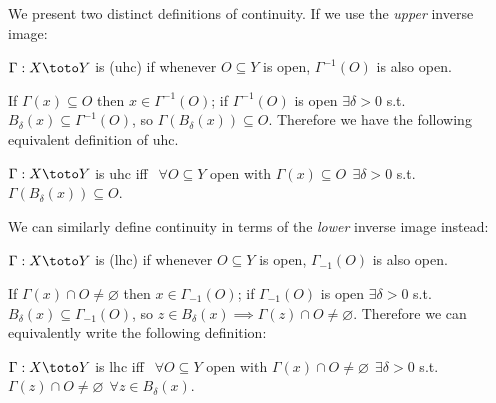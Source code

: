 \documentclass{article}
\begin{document}
We present two distinct definitions of continuity. If we use the \textit{upper} inverse image:
\begin{definition}[uhc]\label{def:lecture3_correspondences_uhc_upper_inverse_image}
  $\Gamma: X \toto Y$ is  (uhc) if whenever $O \subseteq Y$ is open, $\Gamma^{-1}(O)$ is also open.
\end{definition}

If $\Gamma(x) \subseteq O$ then $x \in \Gamma^{-1}(O)$; if $\Gamma^{-1}(O)$ is open $\exists \delta > 0$ s.t. $B_{\delta}(x) \subseteq \Gamma^{-1}(O)$, so $\Gamma(B_{\delta}(x)) \subseteq O$. Therefore we have the following equivalent definition of uhc.

\begin{definition}[uhc]\label{def:lecture3_correspondences_uhc_delta}
  $\Gamma: X \toto Y$ is uhc iff $~~\forall O \subseteq Y$ open with $\Gamma(x) \subseteq O ~~ \exists \delta > 0$ s.t. $\Gamma(B_{\delta}(x)) \subseteq O$.
\end{definition}

We can similarly define continuity in terms of the \textit{lower} inverse image instead:
\begin{definition}[lhc]\label{def:lecture3_correspondences_lhc_lower_inverse_image}
  $\Gamma: X \toto Y$ is  (lhc) if whenever $O \subseteq Y$ is open, $\Gamma_{-1}(O)$ is also open.
\end{definition}

If $\Gamma(x) \cap O \ne \varnothing$ then $x \in \Gamma_{-1}(O)$; if $\Gamma_{-1}(O)$ is open $\exists \delta > 0$ s.t. $B_{\delta}(x) \subseteq \Gamma_{-1}(O)$, so $z \in B_{\delta}(x) \implies \Gamma(z) \cap O \ne \varnothing$. Therefore we can equivalently write the following definition:
\begin{definition}[lhc]\label{def:lecture3_correspondences_lhc_delta}
  $\Gamma: X \toto Y$ is lhc iff $~~\forall O \subseteq Y$ open with $\Gamma(x) \cap O \ne \varnothing ~~ \exists \delta > 0$ s.t. $\Gamma(z) \cap O \ne \varnothing ~~ \forall z \in B_{\delta}(x)$.
\end{definition}
\end{document}
